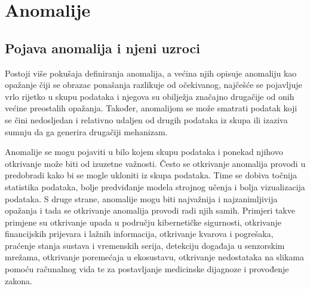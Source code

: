 \documentclass[utf8, diplomski, numeric]{fer}
\begin{document}
\chapter{Anomalije}
\section{Pojava anomalija i njeni uzroci}
Postoji više pokušaja definiranja anomalija, a većina njih opisuje anomaliju kao opažanje čiji se obrazac ponašanja razlikuje od očekivanog, najčešće se pojavljuje vrlo rijetko u skupu podataka i njegova su obilježja značajno drugačije od onih većine preostalih opažanja. Također, anomalijom se može smatrati podatak koji se čini nedosljedan i relativno udaljen od drugih podataka iz skupa ili izaziva sumnju da ga generira drugačiji mehanizam.

Anomalije se mogu pojaviti u bilo kojem skupu podataka i ponekad njihovo otkrivanje može biti od izuzetne važnosti. Često se otkrivanje anomalija provodi u predobradi kako bi se mogle ukloniti iz skupa podataka. Time se dobiva točnija statistika podataka, bolje predviđanje modela strojnog učenja i bolja vizualizacija podataka. S druge strane, anomalije mogu biti najvažnija i najzanimljivija opažanja i tada se otkrivanje anomalija provodi radi njih samih. Primjeri takve primjene su otkrivanje upada u području kibernetičke sigurnosti, otkrivanje financijskih prijevara i lažnih informacija, otkrivanje kvarova i pogrešaka, praćenje stanja sustava i vremenskih serija, detekciju događaja u senzorskim mrežama, otkrivanje poremećaja u ekosustavu, otkrivanje nedostataka na slikama pomoću računalnog vida te za postavljanje medicinske dijagnoze i provođenje zakona.
\end{document}
